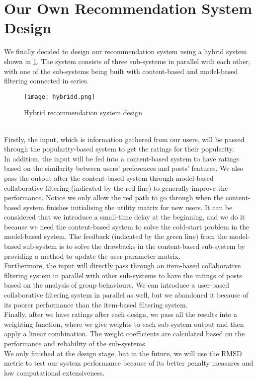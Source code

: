 \section{Our Own Recommendation System Design}
We finally decided to design our recommendation system using a hybrid system shown in \cref{hybridd}. The system consists of three sub-systems in parallel with each other, with one of the sub-systems being built with content-based and model-based filtering connected in series.
\begin{figure}[ht]
    \centering
    \texttt{[image: hybridd.png]}
    \caption{Hybrid recommendation system design}
    \label{hybridd}
    \end{figure}
\\Firstly, the input, which is information gathered from our users, will be passed through the popularity-based system to get the ratings for their popularity.
\\In addition, the input will be fed into a content-based system to have ratings based on the similarity between users' preferences and posts' features. 
We also pass the output after the content-based system through model-based collaborative filtering (indicated by the red line) to generally improve the performance. Notice we only allow the red path to go through when the content-based system finishes initialising the utility matrix for new users. It can be considered that we introduce a small-time delay at the beginning, and we do it because we need the content-based system to solve the cold-start problem in the model-based system. The feedback (indicated by the green line) from the model-based sub-system is to solve the drawbacks in the content-based sub-system by providing a method to update the user parameter matrix.
\\Furthermore, the input will directly pass through an item-based collaborative filtering system in parallel with other sub-systems 
to have the ratings of posts based on the analysis of group behaviours. We can introduce a user-based collaborative filtering system in parallel as well, but we abandoned it because of its poorer performance than the item-based filtering system.
\\Finally, after we have ratings after each design, we pass all the results into a weighting function, where we give weights to each sub-system output and then apply a linear combination.
The weight coefficients are calculated based on the performance and reliability of the sub-systems.
\\We only finished at the design stage, but in the future, we will use the RMSD metric to test our system performance because of its better penalty measures and low computational extensiveness. 

